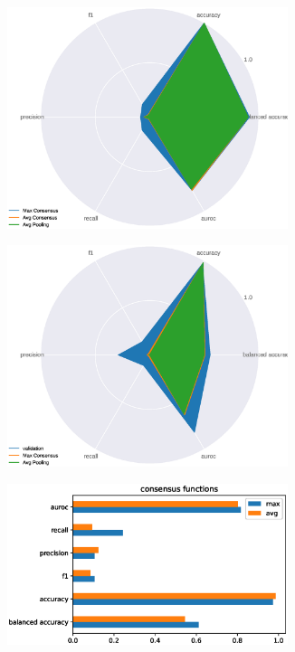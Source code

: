 \begin{figure}[htbp!]
    \centering
    \begin{subfigure}{.33\textwidth}
        \centering
        \includegraphics[width=0.9\textwidth, keepaspectratio, interpolate]{img/07_consensus_r2plus1d.eps}
    \end{subfigure}%
    \begin{subfigure}{.33\textwidth}
        \centering
        \includegraphics[width=0.9\textwidth, keepaspectratio, interpolate]{img/07_consensus_radar.eps}
    \end{subfigure}%
    \begin{subfigure}{.33\textwidth}
        \centering
        \includegraphics[width=0.9\textwidth, keepaspectratio, interpolate]{img/07_consensus.eps}

\end{subfigure}
\end{figure}
